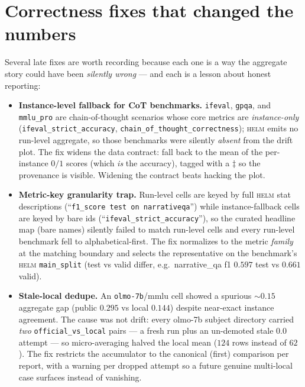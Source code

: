 \documentclass[11pt]{report}
\newcommand{\code}[1]{\texttt{#1}}
\begin{document}
\section{Correctness fixes that changed the numbers}

Several late fixes are worth recording because each one is a way the aggregate story
could have been \emph{silently wrong} --- and each is a lesson about honest
reporting:

\begin{itemize}[nosep]
  \item \textbf{Instance-level fallback for CoT benchmarks.} \code{ifeval},
        \code{gpqa}, and \code{mmlu\_pro} are chain-of-thought scenarios whose core
        metrics are \emph{instance-only} (\code{ifeval\_strict\_accuracy},
        \code{chain\_of\_thought\_correctness}); \textsc{helm} emits no run-level
        aggregate, so those benchmarks were silently \emph{absent} from the drift
        plot. The fix widens the data contract: fall back to the mean of the
        per-instance $0/1$ scores (which \emph{is} the accuracy), tagged with a
        $\ddagger$ so the provenance is visible. Widening the contract beats hacking
        the plot.
  \item \textbf{Metric-key granularity trap.} Run-level cells are keyed by full
        \textsc{helm} stat descriptions (``\code{f1\_score test on narrativeqa}'')
        while instance-fallback cells are keyed by bare ids
        (``\code{ifeval\_strict\_accuracy}''), so the curated headline map (bare
        names) silently failed to match run-level cells and every run-level
        benchmark fell to alphabetical-first. The fix normalizes to the metric
        \emph{family} at the matching boundary and selects the representative on the
        benchmark's \textsc{helm} \code{main\_split} (test vs valid differ, e.g.\
        narrative\_qa f1 $0.597$ test vs $0.661$ valid).
  \item \textbf{Stale-local dedupe.} An \code{olmo-7b}/mmlu cell showed a spurious
        $\sim\!0.15$ aggregate gap (public $0.295$ vs local $0.144$) despite
        near-exact instance agreement. The cause was not drift: every olmo-7b
        subject directory carried \emph{two} \code{official\_vs\_local} pairs --- a
        fresh run plus an un-demoted stale $0.0$ attempt --- so micro-averaging
        halved the local mean ($124$ rows instead of $62$). The fix restricts the
        accumulator to the canonical (first) comparison per report, with a warning
        per dropped attempt so a future genuine multi-local case surfaces instead of
        vanishing.
\end{itemize}
\end{document}
